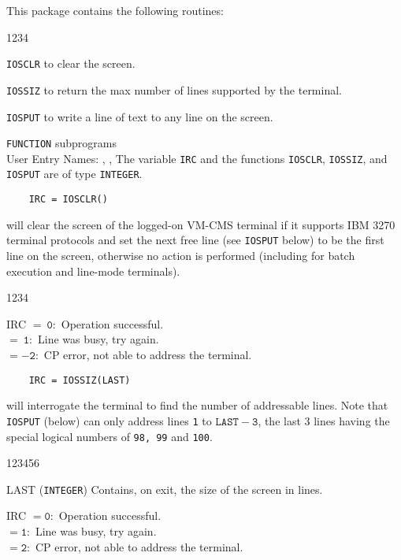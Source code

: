                            
                    
\Submitter{}                                
This package contains the following routines:
\begin{DLtt}{1234}
\item {\tt IOSCLR} to clear the screen.
\item {\tt IOSSIZ} to return the max number of lines supported
by the terminal.
\item {\tt IOSPUT} to write a line of text to any line on the screen.
\end{DLtt}
\Structure
{\tt FUNCTION} subprograms \\
User Entry Names: , , 
\Usage
The variable {\tt IRC} and the functions {\tt IOSCLR}, {\tt IOSSIZ},
and {\tt IOSPUT} are of type {\tt INTEGER}.
\begin{verbatim}
    IRC = IOSCLR()
\end{verbatim}
will clear the screen of the logged-on VM-CMS terminal if it
supports IBM 3270 terminal protocols and set the next free line
(see {\tt IOSPUT} below) to be the first line on the screen, otherwise
no action is performed (including for batch execution and line-mode
terminals).
 \begin{DLtt}{1234}
\item[IRC] $\mathtt{= \ 0:}$ Operation successful. \\
           $\mathtt{= \ 1:}$ Line was busy, try again. \\
           $\mathtt{= -2:}$ CP error, not able to address the terminal.
\end{DLtt}
\begin{verbatim}
    IRC = IOSSIZ(LAST)
\end{verbatim}
will interrogate the terminal to find the number of addressable
lines. Note that {\tt IOSPUT} (below) can only address lines {\tt 1}
to $\mathtt{LAST-3}$, the last 3 lines having the special logical numbers of
{\tt 98, 99} and {\tt 100}.
\begin{DLtt}{123456}
\item [LAST] ({\tt INTEGER}) Contains, on exit, the size of the
screen in lines.
\item[IRC] $\mathtt{= 0:}$ Operation successful.  \\
           $\mathtt{= 1:}$ Line was busy, try again. \\
           $\mathtt{= 2:}$ CP error, not able to address the terminal.
\end{DLtt}
